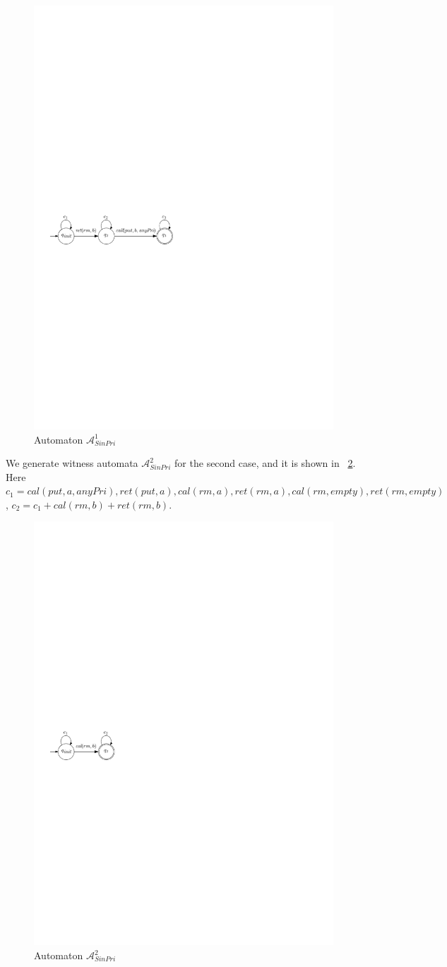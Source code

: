 \begin{figure}[htbp]
  \centering
  \includegraphics[width=0.6 \textwidth]{figures/PIC_AUTO_FIFO_1.pdf}
  \caption{Automaton $\mathcal{A}_{\textit{SinPri}}^1$}
  \label{fig:automata for FIFO-1 in appendix}
\end{figure}


We generate witness automata $\mathcal{A}_{\textit{SinPri}}^2$ for the second case, and it is shown in \figurename~\ref{fig:automata for FIFO-2}. Here $c_1 = \textit{cal}(\textit{put},a,\textit{anyPri}),\textit{ret}(\textit{put},a), \textit{cal}(\textit{rm},a),\textit{ret}(\textit{rm},a),\textit{cal}(\textit{rm},\textit{empty}),\textit{ret}(\textit{rm},\textit{empty})$, $c_2 = c_1 + \textit{cal}(\textit{rm},b) + \textit{ret}(\textit{rm},b)$.


\begin{figure}[htbp]
  \centering
  \includegraphics[width=0.3 \textwidth]{figures/PIC_AUTO_FIFO_2.pdf}
  \caption{Automaton $\mathcal{A}_{\textit{SinPri}}^2$}
  \label{fig:automata for FIFO-2}
\end{figure}

